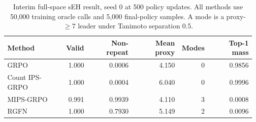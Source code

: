 \begin{table}[htbp]
\centering
\caption{Interim full-space sEH result, seed 0 at 500 policy updates. All
methods use 50,000 training oracle calls and 5,000 final-policy samples. A mode
is a proxy-\(\geq7\) leader under Tanimoto separation 0.5.}
\begin{tabular}{lrrrrr}
\toprule
Method & Valid & Non-repeat & Mean proxy & Modes & Top-1 mass \\
\midrule
GRPO & 1.000 & 0.0006 & 4.150 & 0 & 0.9856 \\
Count IPS-GRPO & 1.000 & 0.0004 & 6.040 & 0 & 0.9996 \\
MIPS-GRPO & 0.991 & 0.9939 & 4.110 & 3 & 0.0008 \\
RGFN & 1.000 & 0.7930 & 5.149 & 2 & 0.0096 \\
\bottomrule
\end{tabular}
\end{table}

